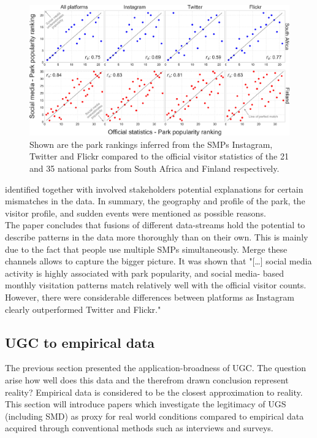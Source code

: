 \begin{figure}[h]
   \centering
   \includegraphics[width=\textwidth]{img/tenkanen_2017_SMPs.pdf}
   \caption{Shown are the park rankings inferred from the SMPs Instagram, Twitter and Flickr compared to the official visitor statistics of the 21 and 35 national parks from South Africa and Finland respectively.}

   \label{fig:tenkanen_SMP}
\end{figure}

\textcite{Tenkanen2017} identified together with involved stakeholders potential explanations for certain mismatches in the data. In summary, the geography and profile of the park, the visitor profile, and sudden events were mentioned as possible reasons.\\
The paper concludes that fusions of different data-streams hold the potential to describe patterns in the data more thoroughly than on their own. This is mainly due to the fact that people use multiple SMPs simultaneously. Merge these channels allows to capture the bigger picture.
It was shown that "[\dots] social media activity is highly associated with park popularity, and social media- based monthly visitation patterns match relatively well with the official visitor counts. However, there were considerable differences between platforms as Instagram clearly outperformed Twitter and Flickr."\parencite{Tenkanen2017}

\subsection{UGC to empirical data} \label{ugc_vs_empirical}
The previous section presented the application-broadness of UGC. The question arise how well does this data and the therefrom drawn conclusion represent reality? Empirical data is considered to be the closest approximation to reality. This section will introduce papers which investigate the legitimacy of UGS (including SMD) as proxy for real world conditions compared to empirical data acquired through conventional methods such as interviews and surveys.

